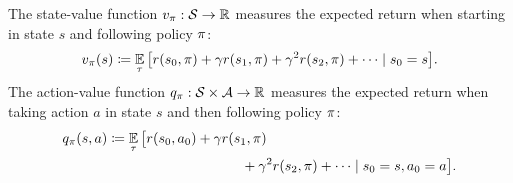 \begin{definition}
The state-value function $v_\pi : \mathcal{S} \to \mathbb{R}$ measures the expected return
when starting in state $s$ and following policy $\pi$:
\begin{align*} 
    v_\pi(s) 
    \coloneqq 
    \operatorname*{\mathbb{E}}_{\tau} \big[ r(s_0, \pi) + \gamma r(s_1, \pi) + \gamma^2 r(s_2, \pi) + \dots \mid s_0 = s \big] .
\end{align*}
The action-value function $q_\pi : \mathcal{S} \times \mathcal{A} \to \mathbb{R}$ measures the expected return when taking action $a$ in state $s$ and then following policy $\pi$:
\begin{align*} 
    &q_\pol(s,a)
    \coloneqq
    \E_{\transit} \big[ r(s_0, a_0) + \discount r(s_1, \pol)
    \\
    &\hspace{4.5cm} + \discount^2 r(s_2, \pol) + \dots \mid s_0 = s, a_0 = a \big] .
\end{align*}
\end{definition}